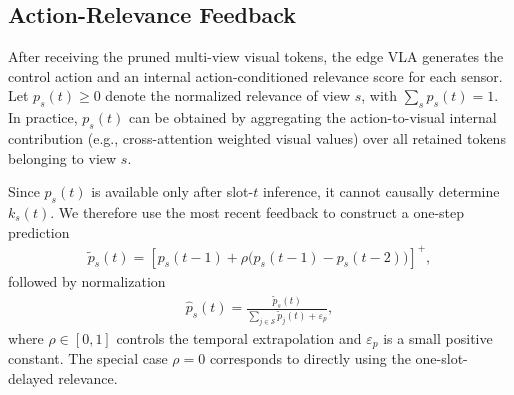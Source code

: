 \documentclass[lettersize,journal]{IEEEtran}
\theoremstyle{custom}
\begin{document}
\subsection{Action-Relevance Feedback}
After receiving the pruned multi-view visual tokens, the edge VLA generates the control action and an internal action-conditioned relevance score for each sensor. Let $p_s(t)\geq0$ denote the normalized relevance of view $s$, with $\sum_s p_s(t)=1$. In practice, $p_s(t)$ can be obtained by aggregating the action-to-visual internal contribution (e.g., cross-attention weighted visual values) over all retained tokens belonging to view $s$.

Since $p_s(t)$ is available only after slot-$t$ inference, it cannot causally determine $k_s(t)$. We therefore use the most recent feedback to construct a one-step prediction
\begin{align}\label{eq:relevance_predictor}
    \widetilde p_s(t)
    =\left[p_s(t-1)+\rho\big(p_s(t-1)-p_s(t-2)\big)\right]^+,
\end{align}
followed by normalization
\begin{align}
    \widehat p_s(t)=\frac{\widetilde p_s(t)}{\sum_{j\in\mathcal S}\widetilde p_j(t)+\varepsilon_p},
\end{align}
where $\rho\in[0,1]$ controls the temporal extrapolation and $\varepsilon_p$ is a small positive constant. The special case $\rho=0$ corresponds to directly using the one-slot-delayed relevance.
\end{document}
